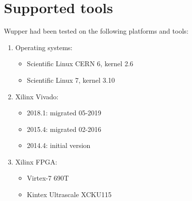 \section{Supported tools}
\label{sec:supported_tools}

Wupper had been tested on the following platforms and tools:

\begin{enumerate}
\item Operating systems: 
\begin{itemize}
\item Scientific Linux CERN 6, kernel 2.6
\item Scientific Linux 7, kernel 3.10
\end{itemize}
\item Xilinx Vivado:
\begin{itemize}
\item 2018.1: migrated 05-2019
\item 2015.4: migrated 02-2016
\item 2014.4: initial version
\end{itemize}
\item Xilinx FPGA:
\begin{itemize}
\item Virtex-7 690T
\item Kintex Ultrascale XCKU115
\end{itemize}
\end{enumerate}

\newpage
